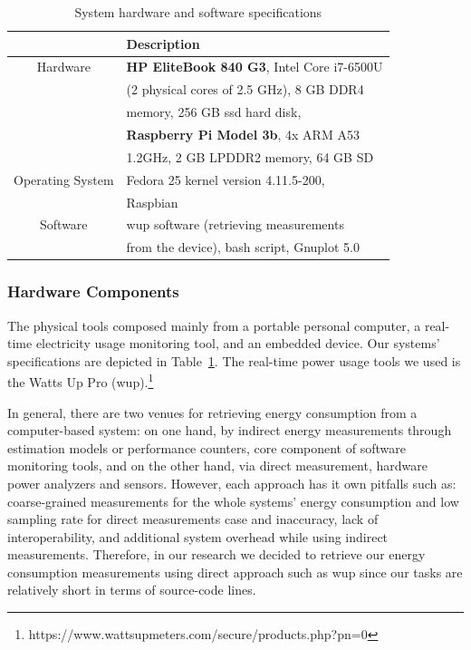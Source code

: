 \begin{table}
	\begin{threeparttable}
		\caption{System hardware and software specifications}
		\label{laptop_specs}
		\begin{tabular}{cl}
			\toprule
			&Description\\
			\midrule
			Hardware	& \textbf{HP EliteBook 840 G3}, Intel Core i7-6500U \\
			& (2 physical cores of 2.5 GHz), 8 GB DDR4  \\
			& memory, 256 GB {\sc ssd}  hard disk, \\
			& \textbf{Raspberry Pi Model 3b}, 4x ARM A53 \\
			& 1.2GHz, 2 GB LPDDR2 memory, 64 GB SD\\
			Operating  System & Fedora 25 kernel version 4.11.5-200,  \\
			& Raspbian\\	
			Software 	& {\sc wup} software (retrieving measurements \\
			& from the device), bash script, Gnuplot 5.0 \\
			\bottomrule
		\end{tabular}
	\end{threeparttable}
\end{table}

\subsubsection{Hardware Components}
The physical tools composed mainly from a portable personal 
computer, a real-time electricity usage monitoring tool, and 
an embedded device.
Our systems' specifications are depicted in Table~\ref{laptop_specs}. 
The real-time power usage tools we used is the Watts Up Pro ({\sc wup}).\footnote{https://www.wattsupmeters.com/secure/products.php?pn=0} 

In general, there are two venues for retrieving energy consumption 
from a computer-based system: on one hand, by indirect energy measurements 
through estimation models or performance counters, core component 
of software monitoring tools, and on the other hand, via direct measurement, 
hardware power analyzers and sensors.  
However, each approach has it own pitfalls such as: coarse-grained 
measurements for the whole systems' energy consumption and low sampling 
rate for direct measurements case and inaccuracy, lack of interoperability, 
and additional system overhead while using indirect measurements. 
Therefore, in our research we decided to retrieve our energy consumption 
measurements using direct approach such as {\sc wup} since our 
tasks are relatively short in terms of source-code lines.


